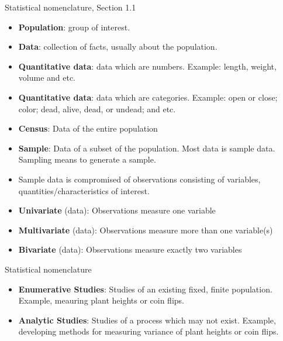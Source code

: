 \documentclass{beamer}
\begin{document}
\begin{frame}{Statistical nomenclature, Section 1.1}
    \begin{itemize}
        \item {\bf Population}: group of interest.
        \item {\bf Data}: collection of facts, usually about the population.
        \item {\bf Quantitative data}: data which are numbers. Example: length, weight, volume and etc.
        \item {\bf Quantitative data}: data which are categories. Example: open or close; color; dead, alive, dead, or undead; and etc.
        \item {\bf Census}: Data of the entire population
        \item {\bf Sample}: Data of a subset of the population. Most data is sample data. Sampling means to generate a sample.
        \item Sample data is compromised of observations consisting of variables, quantities/characteristics of interest.
        \item {\bf Univariate} (data): Observations measure one variable
        \item {\bf Multivariate} (data): Observations measure more than one variable(s)
        \item {\bf Bivariate} (data): Observations measure exactly two variables
    \end{itemize}
\end{frame}

\begin{frame}{Statistical nomenclature}
    \begin{itemize}
        \item {\bf Enumerative Studies}: Studies of an existing fixed, finite population. Example, meauring plant heights or coin flips.
        \item {\bf Analytic Studies}: Studies of a process which may not exist. Example, developing methods for measuring variance of plant heights or coin flips.
    \end{itemize}
\end{frame}
\end{document}
